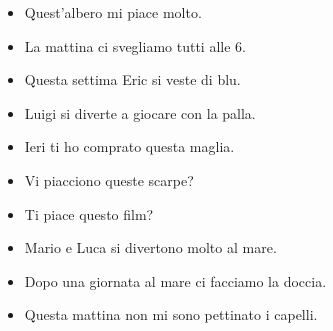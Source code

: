 \documentclass[letter,11pt]{article}
\begin{document}
\vskip 0.2in

\begin{multicols}{2}
\begin{itemize}
    \item Quest'albero mi piace molto.
    \item La mattina ci svegliamo tutti alle 6.
    \item Questa settima Eric si veste di blu.
    \item Luigi si diverte a giocare con la palla.
    \item Ieri ti ho comprato questa maglia.
    \item Vi piacciono queste scarpe?
    \item Ti piace questo film?
    \item Mario e Luca si divertono molto al mare.
    \item Dopo una giornata al mare ci facciamo la doccia.
    \item Questa mattina non mi sono pettinato i capelli.


\end{itemize}
\end{multicols}
\end{document}
